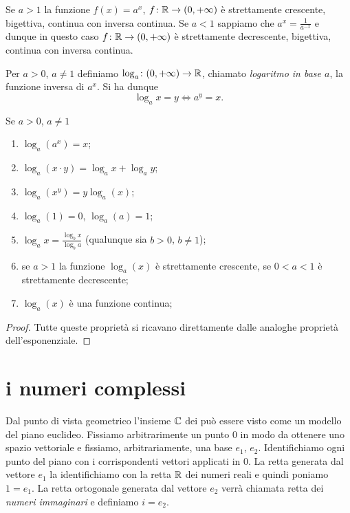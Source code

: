 Se $a> 1$ la funzione $f(x) = a^x$,
$f\colon \mathbb R\to(0,+\infty)$
è strettamente crescente, bigettiva, continua
con inversa continua.
Se $a<1$ sappiamo che $a^x = \frac{1}{a^{-x}}$ e dunque
in questo caso $f\colon \mathbb R \to (0,+\infty)$ è
strettamente decrescente, bigettiva, continua con inversa
continua.

\begin{definition}[logaritmo]
Per $a>0$, $a\neq 1$ definiamo $\log_a\colon (0,+\infty)\to \mathbb R$,
chiamato \emph{logaritmo in base $a$},
la funzione inversa di $a^x$.
Si ha dunque
\[
  \log_a x = y \iff a^y = x.
\]
\end{definition}

\begin{theorem}
Se $a>0$, $a\neq 1$
\begin{enumerate}
  \item $\log_a(a^x) = x$;
  \item $\log_a(x\cdot y)= \log_a x + \log_a y$;
  \item $\log_a(x^y) = y \log_a (x)$;
  \item $\log_a(1) = 0$, $\log_a(a)=1$;
  \item  $\displaystyle  \log_a x = \frac{\log_b x}{\log_b a}$
  (qualunque sia $b>0$, $b\neq 1$);
  \item se $a>1$ la funzione $\log_a(x)$ è strettamente crescente,
  se $0<a<1$ è strettamente decrescente;
  \item $\log_a(x)$ è una funzione continua;
\end{enumerate}
%
\begin{proof}
Tutte queste proprietà si ricavano direttamente dalle analoghe proprietà
dell'esponenziale.
\end{proof}
\end{theorem}

\section{i numeri complessi}

Dal punto di vista geometrico l'insieme $\CC$ dei 
\index{$\CC$}
può essere visto come un modello del piano euclideo.
Fissiamo arbitrarimente un punto $0$ in modo da ottenere uno spazio
vettoriale e fissiamo, arbitrariamente, una base $e_1$, $e_2$.
Identifichiamo ogni punto del piano con i corrispondenti vettori
applicati in $0$. La retta generata dal vettore $e_1$ la identifichiamo
con la retta $\mathbb R$ dei numeri reali e quindi poniamo $1=e_1$.
La retta ortogonale generata dal vettore $e_2$ verrà chiamata
retta dei \emph{numeri immaginari} e definiamo $i=e_2$.

